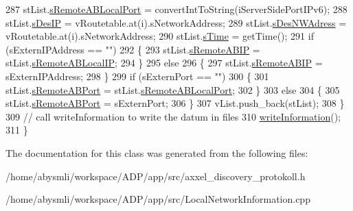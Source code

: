 \begin{DoxyCode}
287         stList.\hyperlink{structstListContainer_aeadf64994288c18847cb1b9fc244922f}{sRemoteABLocalPort} = convertIntToString(iServerSidePortIPv6);
288         stList.\hyperlink{structstListContainer_ab4fde5a0381565943612e2e672b02513}{sDesIP} = vRoutetable.at(i).sNetworkAddress;
289         stList.\hyperlink{structstListContainer_ae886a76fb72d96cbc124544538905ef8}{sDesNWAdress} = vRoutetable.at(i).sNetworkAddress;
290         stList.\hyperlink{structstListContainer_acec007ec5b8190c8bf0242980b0b7528}{sTime} = getTime();
291         \textcolor{keywordflow}{if} (sExternIPAddress == \textcolor{stringliteral}{""})
292         \{
293             stList.\hyperlink{structstListContainer_a2d926770549c1af0e1282f20cdc241e5}{sRemoteABIP} = stList.\hyperlink{structstListContainer_a661224bc268bac73ea4c4f179626f04b}{sRemoteABLocalIP};
294         \}
295         \textcolor{keywordflow}{else}
296         \{
297             stList.\hyperlink{structstListContainer_a2d926770549c1af0e1282f20cdc241e5}{sRemoteABIP} = sExternIPAddress;
298         \}
299         \textcolor{keywordflow}{if} (sExternPort == \textcolor{stringliteral}{""})
300         \{
301             stList.\hyperlink{structstListContainer_ad2a9d2c715866e4fe3a2c588ab3105f0}{sRemoteABPort} = stList.\hyperlink{structstListContainer_aeadf64994288c18847cb1b9fc244922f}{sRemoteABLocalPort};
302         \}
303         \textcolor{keywordflow}{else}
304         \{
305             stList.\hyperlink{structstListContainer_ad2a9d2c715866e4fe3a2c588ab3105f0}{sRemoteABPort} = sExternPort;
306         \}
307         vList.push\_back(stList);
308     \}
309     \textcolor{comment}{// call writeInformation to write the datum in files}
310     \hyperlink{classLocalNetworkInformation_a5f0ad08e02985e56e8693398de34a709}{writeInformation}();
311 \}
\end{DoxyCode}


The documentation for this class was generated from the following files\-:\begin{DoxyCompactItemize}
\item 
/home/abysmli/workspace/\-A\-D\-P/app/src/axxel\-\_\-discovery\-\_\-protokoll.\-h\item 
/home/abysmli/workspace/\-A\-D\-P/app/src/Local\-Network\-Information.\-cpp\end{DoxyCompactItemize}
